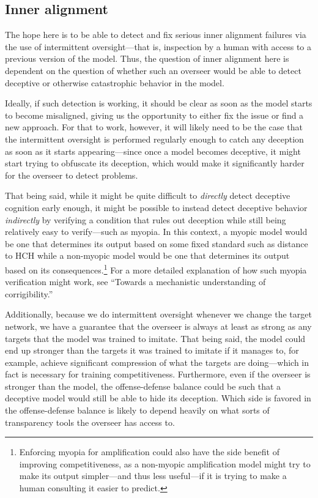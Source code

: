 \documentclass[
  onecolumn,
  natbib,
]{miri-tech-article}
\begin{document}
\subsection{Inner alignment} The hope here is to be able to detect and fix serious inner alignment failures via the use of intermittent oversight---that is, inspection by a human with access to a previous version of the model. Thus, the question of inner alignment here is dependent on the question of whether such an overseer would be able to detect deceptive or otherwise catastrophic behavior in the model.

Ideally, if such detection is working, it should be clear as soon as the model starts to become misaligned, giving us the opportunity to either fix the issue or find a new approach. For that to work, however, it will likely need to be the case that the intermittent oversight is performed regularly enough to catch any deception as soon as it starts appearing---since once a model becomes deceptive, it might start trying to obfuscate its deception, which would make it significantly harder for the overseer to detect problems.

That being said, while it might be quite difficult to \textit{directly} detect deceptive cognition early enough, it might be possible to instead detect deceptive behavior \textit{indirectly} by verifying a condition that rules out deception while still being relatively easy to verify---such as myopia. In this context, a myopic model would be one that determines its output based on some fixed standard such as distance to HCH while a non-myopic model would be one that determines its output based on its consequences.\footnote{Enforcing myopia for amplification could also have the side benefit of improving competitiveness, as a non-myopic amplification model might try to make its output simpler---and thus less useful---if it is trying to make a human consulting it easier to predict.} For a more detailed explanation of how such myopia verification might work, see ``Towards a mechanistic understanding of corrigibility.''\cite{mechanistic}

Additionally, because we do intermittent oversight whenever we change the target network, we have a guarantee that the overseer is always at least as strong as any targets that the model was trained to imitate. That being said, the model could end up stronger than the targets it was trained to imitate if it manages to, for example, achieve significant compression of what the targets are doing---which in fact is necessary for training competitiveness. Furthermore, even if the overseer is stronger than the model, the offense-defense balance could be such that a deceptive model would still be able to hide its deception. Which side is favored in the offense-defense balance is likely to depend heavily on what sorts of transparency tools the overseer has access to.
\end{document}
